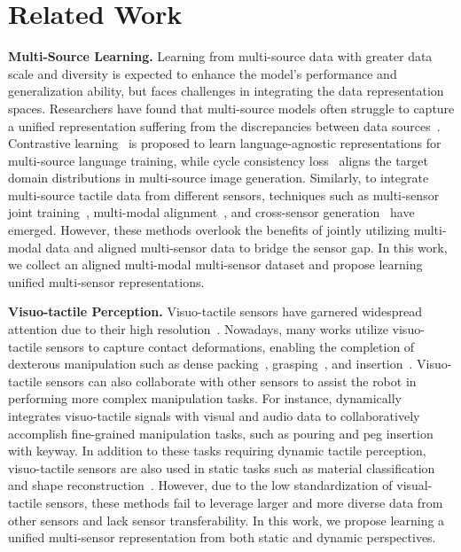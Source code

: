 \section{Related Work}
\vspace{-4pt}

\textbf{Multi-Source Learning.}
Learning from multi-source data with greater data scale and diversity is expected to enhance the model's performance and generalization ability, but faces challenges in integrating the data representation spaces.
Researchers have found that multi-source models often struggle to capture a unified representation suffering from the discrepancies between data sources~\citep{glorot2011domain,zhao2019learning}. 
Contrastive learning~\citep{wang2022english,zhao2023leveraging} is proposed to learn language-agnostic representations for multi-source language training, while cycle consistency loss~\citep{zhu2017unpaired,kim2022style} aligns the target domain distributions in multi-source image generation.
Similarly, to integrate multi-source tactile data from different sensors, techniques such as multi-sensor joint training~\citep{zhao2024transferable,higuerasparsh,gupta2025sensorinvarianttactilerepresentation}, multi-modal alignment~\citep{yang2024binding}, and cross-sensor generation~\citep{rodriguez2024touch2touch} have emerged. However, these methods overlook the benefits of jointly utilizing multi-modal data and aligned multi-sensor data to bridge the sensor gap. 
In this work, we collect an aligned multi-modal multi-sensor dataset and propose learning unified multi-sensor representations.

\textbf{Visuo-tactile Perception.} Visuo-tactile sensors have garnered widespread attention due to their high resolution~\citep{yuan2017gelsight, donlon2018gelslim, lambeta2020digit, zhang2024duragel,zhang2025artificial}. Nowadays, many works utilize visuo-tactile sensors to capture contact deformations, enabling the completion of dexterous manipulation such as dense packing~\citep{li2022see}, grasping~\citep{xu2024unit}, and insertion~\citep{li2014localization}. Visuo-tactile sensors can also collaborate with other sensors to assist the robot in performing more complex manipulation tasks. For instance, \cite{feng2024play} dynamically integrates visuo-tactile signals with visual and audio data to collaboratively accomplish fine-grained manipulation tasks, such as pouring and peg insertion with keyway. In addition to these tasks requiring dynamic tactile perception, visuo-tactile sensors are also used in static tasks such as material classification~\citep{yang2022touch} and shape reconstruction~\citep{gao2022objectfolder2}. 
However, due to the low standardization of visual-tactile sensors, these methods fail to leverage larger and more diverse data from other sensors and lack sensor transferability. In this work, we propose learning a unified multi-sensor representation from both static and dynamic perspectives.


